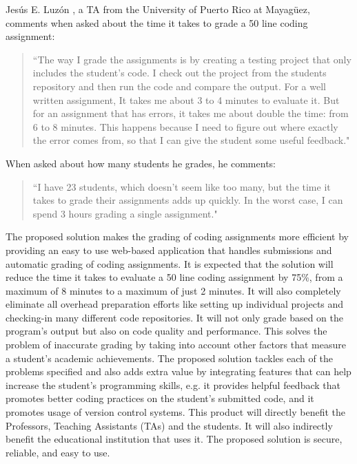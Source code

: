 Jesús E. Luzón \cite{Chiki}, a TA from the University of Puerto Rico at
Mayagüez, comments when asked about the time it takes to grade a 50 line
coding assignment: \begin{quote} ``The way I grade the assignments is by
creating a testing project that only includes the student's code. I check out
the project from the students repository and then run the code and compare the
output. For a well written assignment, It takes me about 3 to 4 minutes to
evaluate it. But for an assignment that has errors, it takes me about double
the time: from 6 to 8 minutes. This happens because I need to figure out where
exactly the error comes from, so that I can give the student some useful
feedback." \end{quote} When asked about how many students he grades, he
comments: \begin{quote} ``I have 23 students, which doesn't seem like too
many, but the time it takes to grade their assignments adds up quickly. In the
worst case, I can spend 3 hours grading a single assignment." \end{quote}


The proposed solution makes the grading of coding assignments more efficient by
providing an easy to use web-based application that handles submissions and
automatic grading of coding assignments. It is expected that the solution will
reduce the time it takes to evaluate a 50 line coding assignment by 75\%, from a
maximum of 8 minutes to a maximum of just 2 minutes. It will also completely
eliminate all overhead preparation efforts like setting up individual projects
and checking-in many different code repositories. It will not only grade based
on the program's output but also on code quality and performance. This solves
the problem of inaccurate grading by taking into account other factors that
measure a student's academic achievements. The proposed solution tackles each of
the problems specified and also adds extra value by integrating features that
can help increase the student's programming skills, e.g. it provides helpful
feedback that promotes better coding practices on the student's submitted code,
and it promotes usage of version control systems. This product will directly
benefit the Professors, Teaching Assistants (TAs) and the students. It will also
indirectly benefit the educational institution that uses it. The proposed
solution is secure, reliable, and easy to use.
